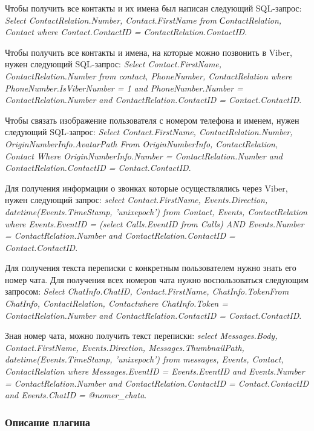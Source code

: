 Чтобы получить все контакты и их имена был написан следующий SQL-запрос: 
\textit{Select ContactRelation.Number, Contact.FirstName from СontactRelation, Contact where Contact.ContactID = ContactRelation.ContactID}.

Чтобы получить все контакты и имена, на которые можно позвонить в Viber, нужен следующий SQL-запрос: 
\textit{Select Contact.FirstName, ContactRelation.Number from contact, PhoneNumber, ContactRelation where PhoneNumber.IsViberNumber = 1 and PhoneNumber.Number = ContactRelation.Number and ContactRelation.ContactID = Contact.ContactID}.

Чтобы связать изображение пользователя с номером телефона и именем, нужен следующий SQL-запрос:
\textit{Select Contact.FirstName, ContactRelation.Number, OriginNumberInfo.AvatarPath From OriginNumberInfo, ContactRelation, Contact Where OriginNumberInfo.Number = ContactRelation.Number and ContactRelation.ContactID = Contact.ContactID}.

Для получения информации о звонках которые осуществлялись через Viber, нужен следующий запрос: 
\textit{select Contact.FirstName, Events.Direction, datetime(Events.TimeStamp, 'unixepoch') from Contact, Events, ContactRelation where Events.EventID = (select Calls.EventID from Calls) AND Events.Number = ContactRelation.Number and ContactRelation.ContactID = Contact.ContactID}.

Для получения текста переписки с конкретным пользователем нужно знать его номер чата. Для получения всех номеров чата нужно воспользоваться следующим запросом: 
\textit{Select ChatInfo.ChatID, Contact.FirstName, ChatInfo.TokenFrom ChatInfo, ContactRelation, Contactwhere ChatInfo.Token = ContactRelation.Number and ContactRelation.ContactID = Contact.ContactID}.

Зная номер чата, можно получить текст переписки: 
\textit{select Messages.Body, Contact.FirstName, Events.Direction, Messages.ThumbnailPath, datetime(Events.TimeStamp, 'unixepoch') from messages, Events, Contact, ContactRelation where Messages.EventID = Events.EventID and Events.Number = ContactRelation.Number and ContactRelation.ContactID = Contact.ContactID and Events.ChatID = @nomer\_chata}.

\subsubsection{Описание плагина}

